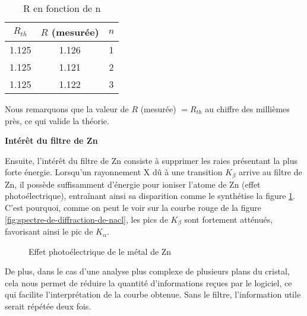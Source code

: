 	
	
	
	



\begin{table}[h!]
	\centering
	\begin{tabular}{|c|c|c|}
		\hline
		$R_{th}$& $R$ (mesurée) & $n$ \\ \hline
		1.125 &1.126 & 1 \\ \hline
		1.125 &1.121& 2 \\ \hline
		1.125 & 1.122& 3 \\ \hline
	\end{tabular}
	\caption{R en fonction de n}
	\label{tab:R en fonction de n}
\end{table}




Nous remarquons que la valeur de $R$ (mesurée) $= R_{th}$ au chiffre des millièmes près, ce qui valide la théorie.

 \begin{flushleft}
	\textbf{Intérêt du filtre de Zn}
\end{flushleft}







 
Ensuite, l'intérêt du filtre de Zn consiste à supprimer les raies présentant la plus forte énergie. Lorsqu'un rayonnement X dû à une transition $K_{\beta}$ arrive au filtre de Zn, il possède suffisamment d'énergie pour ioniser l'atome de Zn (effet photoélectrique), entraînant ainsi sa disparition comme le synthétise la figure \ref{fig: Effet photoélectrique de le métal de Zn}. C'est pourquoi, comme on peut le voir sur la courbe rouge de la figure \ref{fig:spectre-de-diffraction-de-nacl}, les pics de $K_{\beta}$ sont fortement atténués, favorisant ainsi le pic de $K_{\alpha}$. 

\begin{figure}[h!]
	\centering
	
	\caption{Effet photoélectrique de le métal de Zn}
	\label{fig: Effet photoélectrique de le métal de Zn}
\end{figure}


De plus, dans le cas d'une analyse plus complexe de plusieurs plans du cristal, cela nous permet de réduire la quantité d'informations reçues par le logiciel, ce qui facilite l'interprétation de la courbe obtenue. Sans le filtre, l'information utile serait répétée deux fois.






